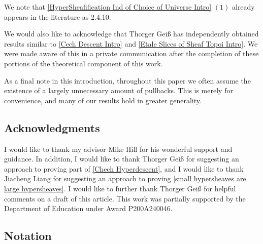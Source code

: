 \documentclass[10pt]{article}
\theoremstyle{witharg}
\theoremstyle{witharg}
\theoremstyle{witharg2}
\newcommand{\sss}{{\fontfamily{lmr}\selectfont\ss}}
\begin{document}
\begin{remark}{}

    We note that \ref{HyperSheafification Ind of Choice of Universe Intro} $(1)$ already appears in the literature as  2.4.10. 
    
\end{remark}


\begin{remark}{}


We would also like to acknowledge that Thorger Gei{\sss} has independently obtained results similar to \ref{Cech Descent Intro} and \ref{Etale Slices of Sheaf Topoi Intro}. We were made aware of this in a private communication after the completion of these portions of the theoretical component of this work.  

\end{remark}



\begin{remark}{}

    As a final note in this introduction, throughout this paper we often assume the existence of a largely unnecessary amount of pullbacks. This is merely for convenience, and many of our results hold in greater generality.
    
\end{remark}










\subsection*{Acknowledgments}

I would like to thank my advisor Mike Hill for his wonderful support and guidance. In addition, I would like to thank Thorger Gei{\sss} for suggesting an approach to proving part of \ref{Chech Hyperdescent}, and I would like to thank Jiacheng Liang for suggesting an approach to proving \ref{small hypersheaves are large hypersheaves}. I would like to further thank Thorger Gei{\sss} for helpful comments on a draft of this article. This work was partially supported by the Department of Education under Award P200A240046.


 
\subsection{Notation}
\end{document}
